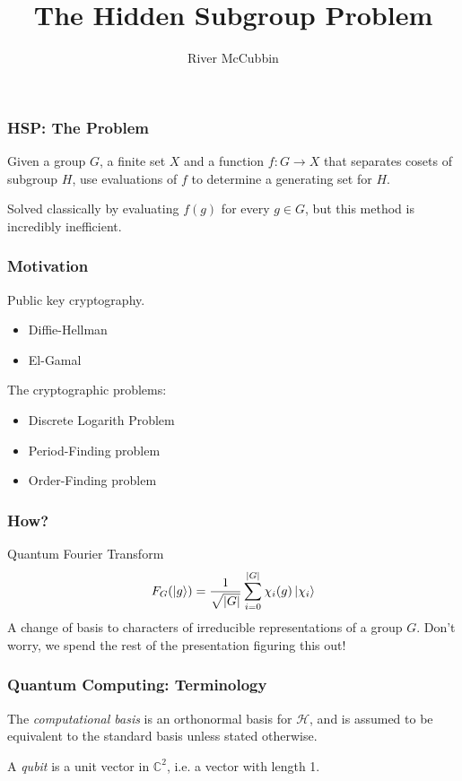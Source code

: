 \documentclass{beamer}
\title{The Hidden Subgroup Problem}
\author{River McCubbin}
\renewcommand{\ket}{\Ket}
\newcommand{\abs}[1]{\left\lvert #1 \right\rvert}
\newcommand{\bb}[1]{\mathbb{#1}}
\renewcommand{\cal}[1]{\mathcal{#1}}
\begin{document}
\frame{\titlepage}

\begin{frame}
\frametitle{HSP: The Problem}
        \begin{problem}\label{problem:HSP}
            Given a group $G$, a finite set $X$ and a function $f: G \to X$ that separates cosets of subgroup $H$, use evaluations of $f$ to determine a generating set for $H$.
        \end{problem}
        Solved classically by evaluating $f(g)$ for every $g \in G$, but this method is incredibly inefficient.
\end{frame}

\begin{frame}
\frametitle{Motivation}
    Public key cryptography.
    \begin{itemize}
    \item Diffie-Hellman
    \item El-Gamal
    \end{itemize}\pause

    The cryptographic problems:
    \begin{itemize}
    \item Discrete Logarith Problem
    \item Period-Finding problem
    \item Order-Finding problem
    \end{itemize}
    \cite{QCQI}
\end{frame}

\begin{frame}
\frametitle{How?}
        Quantum Fourier Transform\pause
        $$ F_G(\ket{g}) = \frac{1}{\sqrt{\abs{G}}} \sum_{i=0}^{\abs{G}} \chi_i(g) \ket{\chi_i}$$
        A change of basis to characters of irreducible representations of a group $G$.\pause
        Don't worry, we spend the rest of the presentation figuring this out!
\end{frame}

\begin{frame}
\frametitle{Quantum Computing: Terminology}\label{history:quantum_computing}
        \begin{definition}\label{def:computational_basis}
            The \textit{computational basis} is an orthonormal basis for $\cal{H}$, and is assumed to be equivalent to the standard basis unless stated otherwise.
        \end{definition}\pause
        \begin{definition}[Qubit]\label{def:qubit}
            A \textit{qubit} is a unit vector in $\bb{C}^2$, i.e. a vector with length 1.
        \end{definition}
\end{frame}
\end{document}
